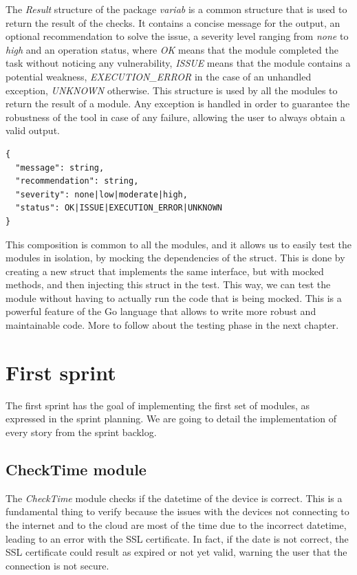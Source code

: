 The \textit{Result} structure of the package \textit{variab} is a common structure that is used to return the result of the checks. It contains a concise message for the output, an optional recommendation to solve the issue, a severity level ranging from \textit{none} to \textit{high} and an operation status, where \textit{OK} means that the module completed the task without noticing any vulnerability, \textit{ISSUE} means that the module contains a potential weakness, \textit{EXECUTION\_ERROR} in the case of an unhandled exception, \textit{UNKNOWN} otherwise. This structure is used by all the modules to return the result of a module. Any exception is handled in order to guarantee the robustness of the tool in case of any failure, allowing the user to always obtain a valid output.

\begin{lstlisting}[style=json, caption={Result struct}]
{
  "message": string,
  "recommendation": string,
  "severity": none|low|moderate|high,
  "status": OK|ISSUE|EXECUTION_ERROR|UNKNOWN
}
\end{lstlisting}

This composition is common to all the modules, and it allows us to easily test the modules in isolation, by mocking the dependencies of the struct. This is done by creating a new struct that implements the same interface, but with mocked methods, and then injecting this struct in the test. This way, we can test the module without having to actually run the code that is being mocked. This is a powerful feature of the Go language that allows to write more robust and maintainable code. More to follow about the testing phase in the next chapter.

\section{First sprint}

The first sprint has the goal of implementing the first set of modules, as expressed in the sprint planning. We are going to detail the implementation of every story from the sprint backlog.

\subsection{CheckTime module}

The \textit{CheckTime} module checks if the datetime of the device is correct. This is a fundamental thing to verify because the issues with the devices not connecting to the internet and to the cloud are most of the time due to the incorrect datetime, leading to an error with the SSL certificate. In fact, if the date is not correct, the SSL certificate could result as expired or not yet valid, warning the user that the connection is not secure.

